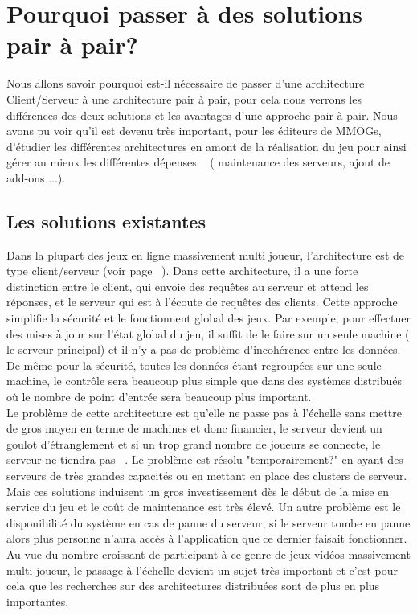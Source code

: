 \section{Pourquoi passer à des solutions pair à pair?}
	\label{whyp2p}
	Nous allons savoir pourquoi est-il nécessaire de passer d'une architecture Client/Serveur à une architecture pair à pair, pour cela nous verrons les différences des deux solutions et les avantages d'une approche pair à pair. Nous avons pu voir qu'il est devenu très important, pour les éditeurs de MMOGs, d'étudier les différentes architectures en amont de la réalisation du jeu pour ainsi gérer au mieux les différentes dépenses ~\cite{14101410} ( maintenance des serveurs, ajout de add-ons ...).
	\subsection{Les solutions existantes}
	Dans la plupart des jeux en ligne massivement multi joueur, l'architecture est de type client/serveur (voir page ~\pageref{P2P/ClServ}). Dans cette architecture, il a une forte distinction entre le client, qui envoie des requêtes au serveur et attend les réponses, et le serveur qui est à l'écoute de requêtes des clients. Cette approche simplifie la sécurité et le fonctionnent global des jeux. Par exemple, pour effectuer des mises à jour sur l'état global du jeu, il suffit de le faire sur un seule machine ( le serveur principal) et il n'y a pas de problème d'incohérence entre les données. De même pour la sécurité, toutes les données étant regroupées sur une seule machine, le contrôle sera beaucoup plus simple que dans des systèmes distribués où le nombre de point d'entrée sera beaucoup plus important. \\
	Le problème de cette architecture est qu'elle ne passe pas à l'échelle sans mettre de gros moyen en terme de machines et donc financier, le serveur devient un goulot d'étranglement et si un trop grand nombre de joueurs se connecte, le serveur ne tiendra pas ~\cite{1198269}. Le problème est résolu "temporairement?" en ayant des serveurs de très grandes capacités ou en mettant en place des clusters de serveur. Mais ces solutions induisent un gros investissement dès le début de la mise en service du jeu et le coût de maintenance est très élevé. Un autre problème est le disponibilité du système en cas de panne du serveur, si le serveur tombe en panne alors plus personne n'aura accès à l'application que ce dernier faisait fonctionner. \\
	Au vue du nombre croissant de participant à ce genre de jeux vidéos massivement multi joueur, le passage à l'échelle devient un sujet très important et c'est pour cela que les recherches sur des architectures distribuées sont de plus en plus importantes. \\
